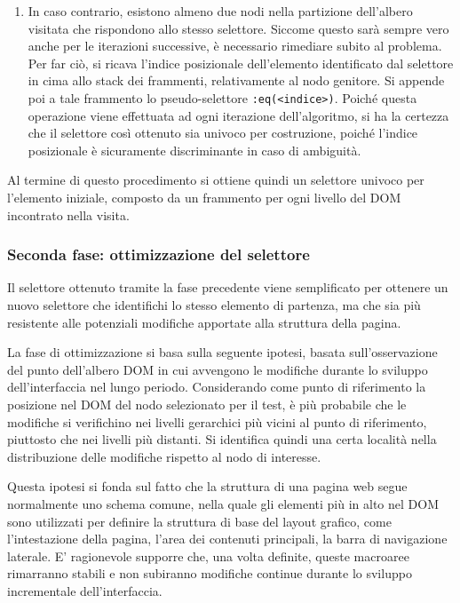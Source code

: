 \begin{enumerate}
\begin{enumerate}
		\item In caso contrario, esistono almeno due nodi nella partizione dell'albero visitata che rispondono allo stesso selettore. Siccome questo sarà sempre vero anche per le iterazioni successive, è necessario rimediare subito al problema. Per far ciò, si ricava l'indice posizionale dell'elemento identificato dal selettore in cima allo stack dei frammenti, relativamente al nodo genitore. Si appende poi a tale frammento lo pseudo-selettore \verb|:eq(<indice>)|. Poiché questa operazione viene effettuata ad ogni iterazione dell'algoritmo, si ha la certezza che il selettore così ottenuto sia univoco per costruzione, poiché l'indice posizionale è sicuramente discriminante in caso di ambiguità.
	\end{enumerate}	
	
\end{enumerate}

Al termine di questo procedimento si ottiene quindi un selettore univoco per l'elemento iniziale, composto da un frammento per ogni livello del DOM incontrato nella visita.

\subsubsection {Seconda fase: ottimizzazione del selettore}

Il selettore ottenuto tramite la fase precedente viene semplificato per ottenere un nuovo selettore che identifichi lo stesso elemento di partenza, ma che sia più resistente alle potenziali modifiche apportate alla struttura della pagina.

La fase di ottimizzazione si basa sulla seguente ipotesi, basata sull'osservazione del punto dell'albero DOM in cui avvengono le modifiche durante lo sviluppo dell'interfaccia nel lungo periodo. Considerando come punto di riferimento la posizione nel DOM del nodo selezionato per il test, è più probabile che le modifiche si verifichino nei livelli gerarchici più vicini al punto di riferimento, piuttosto che nei livelli più distanti. Si identifica quindi una certa località nella distribuzione delle modifiche rispetto al nodo di interesse.

Questa ipotesi si fonda sul fatto che la struttura di una pagina web segue normalmente uno schema comune, nella quale gli elementi più in alto nel DOM sono utilizzati per definire la struttura di base del layout grafico, come l'intestazione della pagina, l'area dei contenuti principali, la barra di navigazione laterale. E' ragionevole supporre che, una volta definite, queste macroaree rimarranno stabili e non subiranno modifiche continue durante lo sviluppo incrementale dell'interfaccia.

